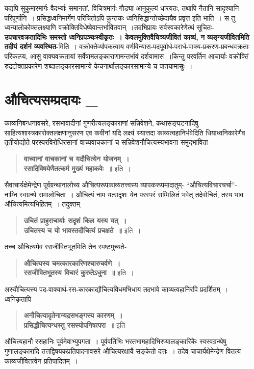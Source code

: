 {यद्यपि सुकुमारमार्गः वैदर्भ्याः समानतां, विचित्रमार्गः गौड्या आनुकूल्यं धारयतः, तथापि नैतानि सादृश्यानि परिपूर्णानि~। प्रसिद्धध्वनिमार्गेण परिचितोऽपि कुन्तकः ध्वनिसिद्धान्तोच्छे\-दायैव प्रवृत्त इति भाति~। स तु ध्वन्यालोकोक्तलक्ष्याणि वक्रोक्तिविधेष्वेवान्तर्भावितवान्~।\break तदभिप्रायः सर्वस्वकारेणेत्थं सूचितः- \textbf{उपचारवक्रतादिभिः समस्तो ध्वनिप्रपञ्चः\break स्वीकृतः~। केवलमुक्तिवैचित्र्यजीवितं काव्यं, न व्यङ्ग्यजीवितमिति तदीयं दर्शनं व्यवस्थित}-मिति~। वक्रोक्तेर्व्यापकत्वाय वर्णविन्यास-पदपूर्वार्ध-परार्ध-वाक्य-प्रकरण-\break प्रबन्धवक्रताः परिकल्प्य, आसु वाक्यवक्रतायां सर्वेषामलङ्काराणामन्तर्भावं दर्शयामास~।\break किन्तु परवर्तिन आचार्याः वक्रोक्तिं रुद्रटोक्तप्रकारेण शब्दालङ्कारसामान्ये केचनार्थालङ्का\-रसामान्ये च पातयामासुः~। 

\section*{ औचित्यसम्प्रदायः \_} 

काव्यनिबन्धनावसरे, रसभावादीनां गुणरीत्यलङ्काराणां सन्निवेशने, कथासङ्घटनादिषु साहित्य\-शास्त्रकारोक्तलक्षणानुसरण एव कवीनां यदि लक्ष्यं स्यात्तदा काव्यत्वहानिर्भवेदिति धिया\break ध्वनिकारेणैव तृतीयोद्योते परस्परविरोधिरसानां वाच्यवाचकानां च सन्निवेशनौचित्यस्य\break भावना समुद्भाविता - 
\begin{verse}
\textbf{वाच्यानां वाचकानां च यदौचित्येन योजनम्~। \\
रसादिविषयेणैतत्कर्म मुख्यं महाकवेः~॥} इति~। 
\end{verse}

सैवाचार्यक्षेमेन्द्रेण पूर्वग्रन्थानालोच्य औचित्यरूपकाव्यतत्त्वस्य व्यापकरूपमादातुम्- “औचित्यविचारचर्चा”- नाम्नि स्वग्रन्थे समालोचिता~। औचित्यं नाम यत्सदृशः येन परस्परं सम्मिलितं भवेत् तदेवोचितं, तस्य भाव औचित्यमित्यभिहितम्~। तदुक्तम्

\begin{verse}
\textbf{उचितं प्राहुराचार्याः सदृशं किल यस्य यत्~। \\
उचितस्य च यो भावस्तदौचित्यं प्रचक्षते~॥} इति~। 
\end{verse} 
तच्च औचित्यमेव रसजीवितभूतमिति तेन स्पष्टमुच्यते-
\begin{verse}
\textbf{औचित्यस्य चमत्कारकारिणश्चारुचर्वणे~। \\
रसजीवितभूतस्य विचारं कुरुतेऽधुना~॥} इति~। 
\end{verse}
अस्यौचित्यस्य पद-वाक्यार्थ-रस-कारकाद्यौचित्यविधमभिधाय तदभावे काव्यत्वहानिरपि प्रदर्शितम्~। ध्वनिकृतापि
\begin{verse}
\textbf{अनौचित्यादृतेनान्यद्रसभङ्गस्य कारणम्~। \\
प्रसिद्धौचित्यन्धस्तु रसस्योपनिषत्परा~॥} इति 
\end{verse}
औचित्यहानौ रसहानिः पूर्वमेवाभ्युपगता~। पूर्ववर्तिभिः भरतभामहादिभिरप्यालङ्कारिकैः स्वस्वग्रन्थेषु गुणालङ्कारादि तत्तद्विषयकप्रतिपादनावसरे औचित्यरक्षायै सङ्केतो दत्तः~। तदेव चाचार्यक्षेमेन्द्रेण वितत्य काव्यजीवितत्वेन प्रतिपादितम्~। 

}
